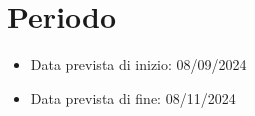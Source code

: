 \section{Periodo}
\begin{itemize}
    \item Data prevista di inizio: 08/09/2024
    \item Data prevista di fine: 08/11/2024
\end{itemize}